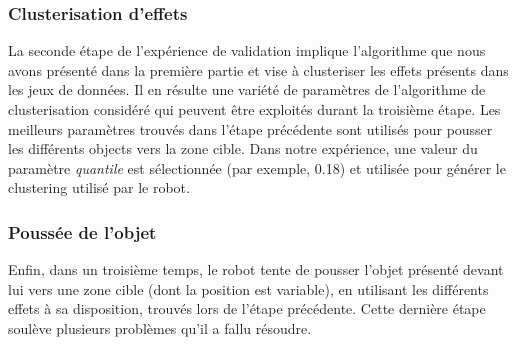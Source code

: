 \documentclass[draft]{llncs}
\begin{document}
\subsubsection{Clusterisation d'effets}
La seconde étape de l'expérience de validation implique l'algorithme que nous avons présenté dans la première partie et vise à clusteriser les effets présents dans les jeux de données.
Il en résulte une variété de paramètres de l'algorithme de clusterisation considéré qui peuvent être exploités durant la troisième étape.
Les meilleurs paramètres trouvés dans l'étape précédente sont utilisés pour pousser les différents objects vers la zone cible.
Dans notre expérience, une valeur du paramètre \textit{quantile} est sélectionnée (par exemple, 0.18) et utilisée pour générer le clustering utilisé par le robot.




\subsubsection{Poussée de l'objet}
Enfin, dans un troisième temps, le robot tente de pousser l'objet présenté devant lui vers une zone cible (dont la position est variable), en utilisant les différents effets à sa disposition, trouvés lors de l'étape précédente.
Cette dernière étape soulève plusieurs problèmes qu'il a fallu résoudre. 


\end{document}
